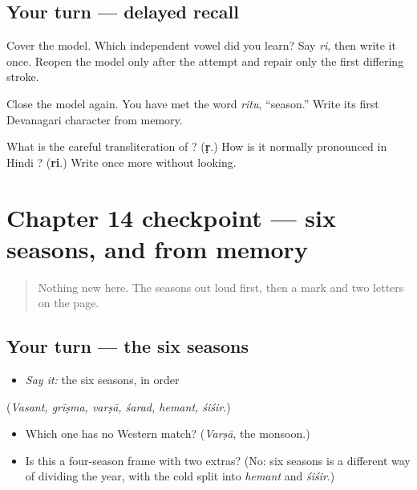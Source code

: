 \subsection*{Your turn — delayed recall}
Cover the model. Which independent vowel did you learn? Say \emph{ri}, then write it once. Reopen the model only after the attempt and repair only the first differing stroke.

\begin{tcolorbox}[breakable,colback=teal!4,colframe=teal!35!black,title={Before you move on}]
Close the model again. You have met the word \emph{ritu}, “season.” Write its first Devanagari character from memory.

What is the careful transliteration of \textbf{}? (\textbf{ṛ}.) How is it normally pronounced in Hindi \textbf{}? (\textbf{ri}.) Write \textbf{} once more without looking.
\end{tcolorbox}
\section[Practice]{Chapter 14 checkpoint — six seasons, and  from memory}

\label{lesson:HI-C14-checkpoint}



\begin{quote}
Nothing new here. The seasons out loud first, then a mark and two letters on the page.
\end{quote}

\subsection*{Your turn — the six seasons}
\begin{itemize}
\raggedright
  \item \emph{Say it:} the six seasons, in order
\end{itemize}

(\emph{Vasant, grīṣma, varṣā, śarad, hemant, śiśir}.)

\begin{itemize}
\raggedright
  \item Which one has no Western match? (\emph{Varṣā}, the monsoon.)
  \item Is this a four-season frame with two extras? (No: six seasons is a different way of dividing the year, with the cold split into \emph{hemant} and \emph{śiśir}.)
\end{itemize}

